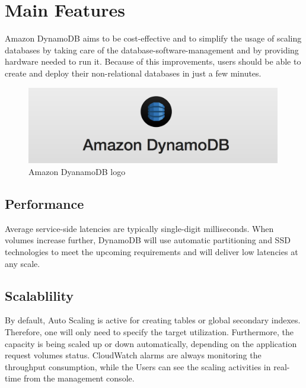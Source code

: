 \chapter{Main Features}
\label{cha:main-features}

Amazon DynamoDB aims to be cost-effective and to simplify the usage of scaling databases by taking care of the database-software-management and by providing hardware needed to run it. Because of this improvements, users should be able to create and deploy their non-relational databases in just a few minutes. 

\vspace{20pt}

\begin{figure}[H]
\centering
	\includegraphics[width=0.99\textwidth]{images/dynamodb-logo}
	\caption{Amazon DyanamoDB logo}
	\label{fig:logo}
\end{figure}

\vspace{20pt}

\section{Performance} 
		Average service-side latencies are typically single-digit milliseconds. When volumes increase further, DynamoDB will use automatic partitioning and SSD technologies to meet the upcoming requirements and will deliver low latencies at any scale.
		
\section{Scalablility} 
		By default, Auto Scaling is active for creating tables or global secondary indexes. Therefore, one will only need to specify the target utilization. 
		Furthermore, the capacity is being scaled up or down automatically, depending on the application request volumes status. 
		CloudWatch alarms are always monitoring the throughput consumption, while the Users can see the scaling activities in real-time from the management console. 
		
